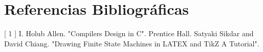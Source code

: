 \section{Referencias Bibliográficas}

[ 1 ] I. Holub Allen. "Compilers Design in C". Prentice Hall. \hfill \break \break
[ 2 ] Satyaki Sikdar and David Chiang. "Drawing Finite State Machines in LATEX and TikZ A Tutorial".